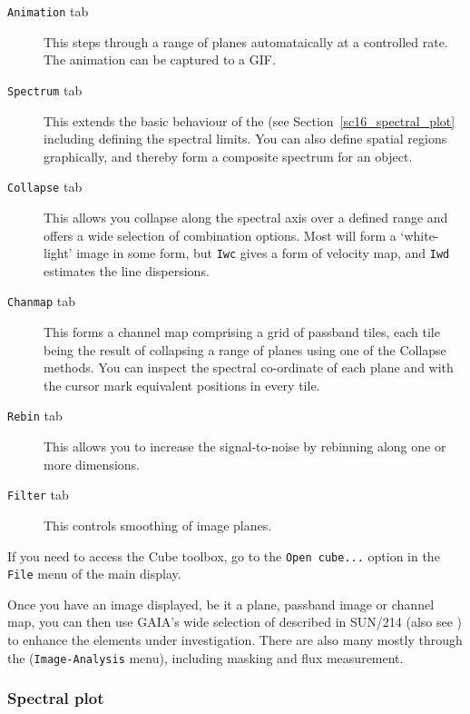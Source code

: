 \documentclass[twoside,11pt]{starlink}
\providecommand{\GAIA}{{\footnotesize GAIA}\normalsize}
\begin{document}
\begin{description}

\item[\texttt{Animation} tab]
This steps through a range of planes automataically at a controlled rate.
The animation can be captured to a GIF.

\item[\texttt{Spectrum} tab]
This extends the basic behaviour of the  (see Section~\ref{sc16_spectral_plot}
including defining the spectral limits.  You can also define spatial
regions graphically, and thereby form a composite spectrum for an
object.

\item[\texttt{Collapse} tab]
This allows you collapse along the spectral axis over a defined range
and offers a wide selection of combination options.  Most will form
a `white-light' image in some form, but \texttt{Iwc} gives a form of
velocity map, and \texttt{Iwd} estimates the line dispersions.

\item[\texttt{Chanmap} tab]
This forms a channel map comprising a grid of passband tiles, each tile
being the result of collapsing a range of planes using one of the
Collapse methods.  You can inspect the spectral co-ordinate of each
plane and with the cursor mark equivalent positions in every tile.

\item[\texttt{Rebin} tab]
This allows you to increase the signal-to-noise by rebinning along one or
more dimensions.

\item[\texttt{Filter} tab]
This controls smoothing of image planes.

\end{description}

If you need to access the Cube toolbox, go to the \texttt{Open cube...}
option in the \texttt{File} menu of the main display.

Once you have an image displayed, be it a plane, passband image or
channel map, you can then use \GAIA's wide selection of
described in SUN/214 (also see ) to
enhance the elements under investigation.  There are also many
mostly through the (\texttt{Image-Analysis} menu), including masking and
flux measurement.

\subsubsection{Spectral plot\label{sc16_spectral_plot}}
\end{document}

